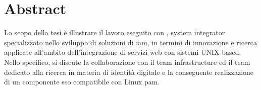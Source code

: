 
\cleardoublepage
{}
{}
\begingroup
\let\clearpage\relax
\let\cleardoublepage\relax
\let\cleardoublepage\relax

\chapter*{Abstract}

Lo scopo della tesi è illustrare il lavoro eseguito con \myAzienda{}, system integrator specializzato nello sviluppo di soluzioni di \acrfull{iam}, in termini di innovazione e ricerca applicate all'ambito dell'integrazione di servizi web con sistemi UNIX-based. Nello specifico, si discute la collaborazione con il team infrastructure ed il team dedicato alla ricerca in materia di identità digitale e la conseguente realizzazione di un componente \acrfull{sso} compatibile con Linux \acrfull{pam}. ​

%
%

\endgroup			

\vfill

